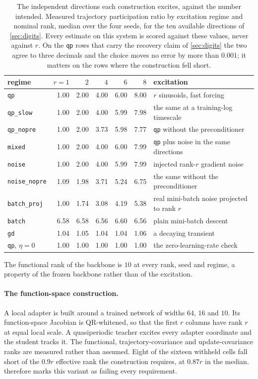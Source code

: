 \documentclass{article}
\begin{document}
\begin{table}[H]
\centering
\caption{The independent directions each construction excites, against the number intended. Measured
trajectory participation ratio by excitation regime and nominal rank, median over the four seeds,
for the ten available directions of \cref{sec:digits}. Every estimate on this system is scored
against these values, never against $r$. On the \texttt{qp} rows that carry the recovery claim of
\cref{sec:digits} the two agree to three decimals and the choice moves no error by more than
$0.001$; it matters on the rows where the construction fell short.}
\label{tab:gt}
\setlength{\tabcolsep}{4.2pt}
\begin{tabular}{lrrrrrl}
\toprule
regime & $r=1$ & $2$ & $4$ & $6$ & $8$ & excitation \\
\midrule
\texttt{qp}          & 1.00 & 2.00 & 4.00 & 6.00 & 8.00 & $r$ sinusoids, fast forcing \\
\texttt{qp\_slow}     & 1.00 & 2.00 & 4.00 & 5.99 & 7.98 & the same at a training-log timescale \\
\texttt{qp\_nopre}    & 1.00 & 2.00 & 3.73 & 5.98 & 7.77 & \texttt{qp} without the preconditioner \\
\texttt{mixed}       & 1.00 & 2.00 & 4.00 & 6.00 & 7.99 & \texttt{qp} plus noise in the same directions \\
\texttt{noise}       & 1.00 & 2.00 & 4.00 & 5.99 & 7.99 & injected rank-$r$ gradient noise \\
\texttt{noise\_nopre} & 1.09 & 1.98 & 3.71 & 5.24 & 6.75 & the same without the preconditioner \\
\texttt{batch\_proj}  & 1.00 & 1.74 & 3.08 & 4.19 & 5.38 & real mini-batch noise projected to rank $r$ \\
\texttt{batch}       & 6.58 & 6.58 & 6.56 & 6.60 & 6.56 & plain mini-batch descent \\
\texttt{gd}          & 1.04 & 1.05 & 1.04 & 1.04 & 1.06 & a decaying transient \\
\midrule
\texttt{qp}, $\eta=0$ & 1.00 & 1.00 & 1.00 & 1.00 & 1.00 & the zero-learning-rate check \\
\bottomrule
\end{tabular}
\end{table}

The functional rank of the backbone is $10$ at every rank, seed and regime, a property of the frozen
backbone rather than of the excitation.

\paragraph{The function-space construction.} A local adapter is built around a trained network of
widths $64$, $16$ and $10$. Its function-space Jacobian is QR-whitened, so that the first
$r$ columns have rank $r$ at equal local scale. A quasiperiodic teacher excites every adapter
coordinate and the student tracks it. The
functional, trajectory-covariance and update-covariance ranks are measured rather than assumed.
Eight of the sixteen withheld cells fall short of the $0.9r$ effective rank the construction
requires, at $0.87r$ in the median.  therefore marks this variant as failing every
requirement.
\end{document}
